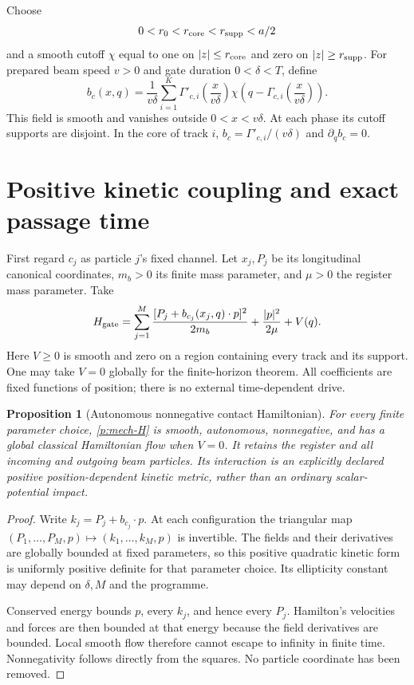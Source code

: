 \documentclass[11pt,oneside,openany]{book}
\newtheorem{proposition}[theorem]{Proposition}
\theoremstyle{definition}
\theoremstyle{remark}\newtheorem{remark}[theorem]{Remark}
\begin{document}
Choose
\[
 0<r_0<r_{\rm core}<r_{\rm supp}<a/2
\]
and a smooth cutoff $\chi$ equal to one on $|z|\le r_{\rm core}$ and zero on
$|z|\ge r_{\rm supp}$. For prepared beam speed $v>0$ and gate duration
$0<\delta<T$, define
\begin{equation}\label{p:mech-field}
 b_c(x,q)=\frac1{v\delta}\sum_{i=1}^K
 \Gamma'_{c,i}\!\left(\frac{x}{v\delta}\right)
 \chi\!\left(q-\Gamma_{c,i}\!\left(\frac{x}{v\delta}\right)\right).
\end{equation}
This field is smooth and vanishes outside $0<x<v\delta$. At each phase its
cutoff supports are disjoint. In the core of track $i$,
$b_c=\Gamma'_{c,i}/(v\delta)$ and $\partial_qb_c=0$.

\section{Positive kinetic coupling and exact passage time}

First regard $c_j$ as particle $j$'s fixed channel. Let $x_j,P_j$ be its
longitudinal canonical coordinates, $m_b>0$ its finite mass parameter, and
$\mu>0$ the register mass parameter. Take
\begin{equation}\label{p:mech-H}
 H_{\rm gate}=
 \sum_{j=1}^M\frac{[P_j+b_{c_j}(x_j,q)\cdot p]^2}{2m_b}
 +\frac{|p|^2}{2\mu}+V(q).
\end{equation}
Here $V\ge0$ is smooth and zero on a region containing every track and its
support. One may take $V=0$ globally for the finite-horizon theorem.
All coefficients are fixed functions of position; there is no external
time-dependent drive.

\begin{proposition}[Autonomous nonnegative contact Hamiltonian]
\label{p:mech-hamiltonian}
For every finite parameter choice, \eqref{p:mech-H} is smooth, autonomous,
nonnegative, and has a global classical Hamiltonian flow when $V=0$.
It retains the register and all incoming and outgoing beam particles.
Its interaction is an explicitly declared positive position-dependent kinetic
metric, rather than an ordinary scalar-potential impact.
\end{proposition}
\begin{proof}
Write $k_j=P_j+b_{c_j}\cdot p$. At each configuration the triangular map
$(P_1,\ldots,P_M,p)\mapsto(k_1,\ldots,k_M,p)$ is invertible.
The fields and their derivatives are globally bounded at fixed parameters,
so this positive quadratic kinetic form is uniformly positive definite for
that parameter choice. Its ellipticity constant may depend on $\delta,M$
and the programme.

Conserved energy bounds $p$, every $k_j$, and hence every $P_j$.
Hamilton's velocities and forces are then bounded at that energy because
the field derivatives are bounded. Local smooth flow therefore cannot
escape to infinity in finite time. Nonnegativity follows directly from the
squares. No particle coordinate has been removed.
\end{proof}
\end{document}
